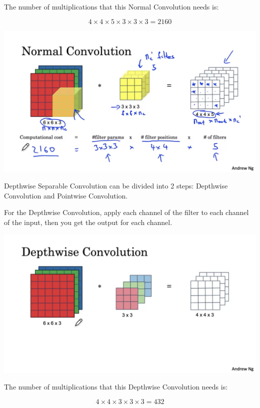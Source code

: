 \documentclass{article}
\begin{document}
\noindent The number of multiplications that this Normal Convolution needs is:

\[4 \times 4 \times 5 \times 3 \times 3 \times 3 = 2160\]

\begin{center}
\includegraphics[scale=0.3]{./images/mobilenet_normal_conv.png}
\end{center}

\noindent Depthwise Separable Convolution can be divided into 2 steps: Depthwise Convolution and Pointwise Convolution.

\bigskip

\noindent For the Depthwise Convolution, apply each channel of the filter to each channel of the input, then you get the output for each channel.

\begin{center}
\includegraphics[scale=0.3]{./images/mobilenet_depthwise_conv.png}
\end{center}

\noindent The number of multiplications that this Depthwise Convolution needs is:

\[4 \times 4 \times 3 \times 3 \times 3 = 432\]
\end{document}
